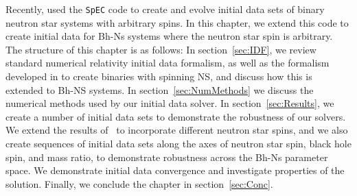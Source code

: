 Recently, \cite{Tacik:2015tja} used the {\tt SpEC} code to create and
evolve initial data sets of binary neutron star systems with arbitrary
spins. In this chapter, we extend this code to create initial data for
Bh-Ns systems where the neutron star spin is arbitrary. The structure of this
chapter is as follows: In section~\ref{sec:IDF}, we review standard numerical relativity initial data formalism, as well as the formalism
developed in \cite{Tichy:2011gw} to create binaries with spinning NS,
and discuss how this is extended to Bh-NS systems. In section~\ref{sec:NumMethods} we discuss the numerical methods used by our initial data solver.
In section~\ref{sec:Results}, we create a number of initial data sets to demonstrate the robustness of our solvers. We extend the results of~\cite{Foucart:2013a} to incorporate different neutron star spins,
and we also create sequences of initial data sets along the axes of neutron star spin, black hole spin, and mass ratio, to demonstrate robustness across the Bh-Ns parameter space. We demonstrate initial data convergence and investigate properties of the solution. Finally, we conclude the chapter in section~\ref{sec:Conc}.

